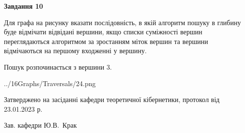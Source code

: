 \documentclass[12pt, ukrainian]{article}
\begin{document}
{\begin {large}
{\begin {center}\textbf{Завдання 10}\end {center}}\par
Для графа на рисунку вказати послідовність, в якій алгоритм пошуку в глибину буде відмічати відвідані вершини, якщо списки суміжності вершин переглядаються алгоритмом за зростанням міток вершин та вершини відмічаються на першому вход\-женні у вершину.\par
Пошук розпочинається з вершини 3.\par

\begin{center}
	{../16Graphs/Traversals/24.png}
\end{center}\par
\newpage


\end {large}
}
{\smallskip \begin {small} Затверджено на засіданні кафедри теоретичної кібернетики, протокол  від   23.01.2023 р.\par\smallskip\smallskip
{\parbox {6.5 cm}{Зав. кафедри \dotfill Ю.В.~Крак}} \end{small}}
\end{document}
